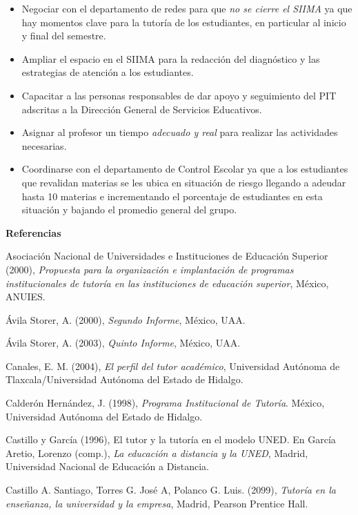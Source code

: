 \enlargethispage{1\baselineskip}
\begin{itemize}
\item Negociar con el departamento de redes para que \textit{no se cierre el
SIIMA} ya que hay momentos clave para la tutoría de los estudiantes, en
particular al inicio y final del semestre.
\item Ampliar el espacio en el SIIMA para la redacción del diagnóstico y las
estrategias de atención a los estudiantes.
\item Capacitar a las personas responsables de dar apoyo y seguimiento del
PIT adscritas a la Dirección General de Servicios Educativos.
\item Asignar al profesor un tiempo \textit{adecuado y real} para realizar
las actividades necesarias.
\item Coordinarse con el departamento de Control Escolar ya que a los
estudiantes que revalidan materias se les ubica en situación de riesgo
llegando a adeudar hasta 10 materias e incrementando el porcentaje de
estudiantes en esta situación y bajando el promedio general del grupo.
\end{itemize}

%
\bigskip
{\bfseries Referencias}

\medskip
Asociación Nacional de Universidades e Instituciones de Educación Superior
(2000), \textit{Propuesta para la organización e implantación de programas
institucionales de tutoría en las instituciones de educación superior},
México, ANUIES.

Ávila Storer, A. (2000), \textit{Segundo Informe}, México, UAA.

Ávila Storer, A. (2003), \textit{Quinto Informe}, México, UAA.

Canales, E. M. (2004), \textit{El perfil del tutor académico}, Universidad
Autónoma de Tlaxcala\slash{}Universidad Autónoma del Estado de Hidalgo.

Calderón Hernández, J. (1998), \textit{Programa Institucional de Tutoría}.
México, Universidad Autónoma del Estado de Hidalgo.

Castillo y García (1996), El tutor y la tutoría en el modelo UNED. En
García Aretio, Lorenzo (comp.), \textit{La educación a distancia y la
UNED}, Madrid, Universidad Nacional de Educación a Distancia.

Castillo A. Santiago, Torres G. José A, Polanco G. Luis. (2099),
\textit{Tutoría en la enseñanza, la universidad y la empresa}, Madrid,
Pearson Prentice Hall.

